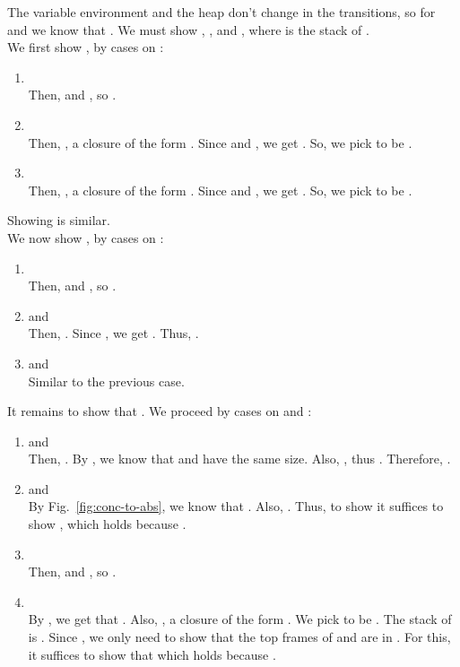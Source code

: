 \documentclass{LMCS}
\theoremstyle{definition} \newtheorem{property}[thm]{Property}
\begin{document}
\begin{enumerate}[]
    The variable environment and the heap don't change in the transitions, so 
    for  and  we know that .
    We must show , ,
     and ,
    where  is the stack of . \\
    We first show , by cases on :
    \begin{enumerate}[]
    \item 
       \\
      Then,  and , so .
    \item
       \\
      Then, , a closure of the form 
      .
      Since  and
      , we get .
      So, we pick  to be \mlam.
    \item
       \\
      Then, , a closure of the form 
      .
      Since  and ,
      we get .
      So, we pick  to be \mlam.
    \end{enumerate}
    Showing  is similar. \\
    We now show , by cases on :
    \begin{enumerate}[]
    \item 
       \\
      Then,  and , so .
    \item 
       and  \\
      Then, .
      Since , we get .
      Thus, .
    \item
       and  \\
      Similar to the previous case.
    \end{enumerate}
    It remains to show that .
    We proceed by cases on  and : 
    \begin{enumerate}[]
    \item 
       and  \\
      Then, .
      By , we know that \tsenv{} and \stenv{} have
      the same size.
      Also, , thus .
      Therefore, .
    \item
       and  \\
      By Fig.~\ref{fig:conc-to-abs}, we know that .
      Also, .
      Thus, to show  it suffices to show
      , which holds because
      .
    \item
       \\
      Then,  and , so .
    \item
       \\
      By , we get that .
      Also, , a closure of the form 
      .
      We pick  to be \mlam.
      The stack of  is .
      Since , we only need to show that
      the top frames of  and  are in .
      For this, it suffices to show that 
      which holds because .
    \end{enumerate}
  

\end{enumerate}
\end{document}
